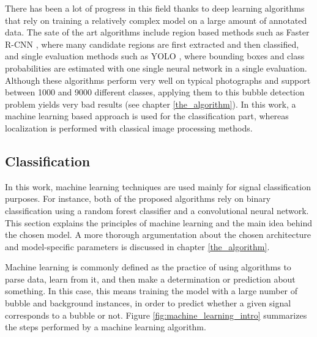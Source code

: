 	There has been a lot of progress in this field thanks to deep learning algorithms that rely on training a relatively complex model on a large amount of annotated data. The sate of the art algorithms include region based methods such as Faster R-CNN \citep{FasterRCNN}, where many candidate regions are first extracted and then classified, and single evaluation methods such as YOLO \citep{YOLO}, where bounding boxes and class probabilities are estimated with one single neural network in a single evaluation. Although these algorithms perform very well on typical photographs and support between 1000 and 9000 different classes, applying them to this bubble detection problem yields very bad results (see chapter \ref{the_algorithm}). 
	In this work, a machine learning based approach is used for the classification part, whereas localization is performed with classical image processing methods.
		
		\subsection{Classification}\label{classification}
		In this work, machine learning techniques are used mainly for signal classification purposes. For instance, both of the proposed algorithms rely on binary classification using a random forest classifier and a convolutional neural network. This section explains the principles of machine learning and the main idea behind the chosen model. A more thorough argumentation about the chosen architecture and model-specific parameters is discussed in chapter \ref{the_algorithm}.

		Machine learning is commonly defined as the practice of using algorithms to parse data, learn from it, and then make a determination or prediction about something. In this case, this means training the model with a large number of bubble and background instances, in order to predict whether a given signal corresponds to a bubble or not. Figure \ref{fig:machine_learning_intro} summarizes the steps performed by a machine learning algorithm. 
		
